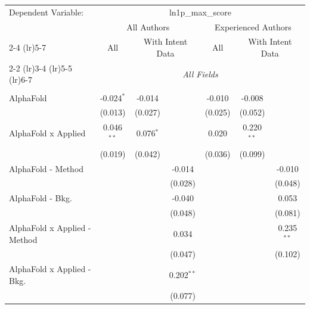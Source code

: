 \begingroup
\centering
\begin{tabular}{lcccccc}
   \tabularnewline \midrule \midrule
   Dependent Variable: & \multicolumn{6}{c}{ln1p\_max\_score}\\
 & \multicolumn{3}{c}{All Authors} & \multicolumn{3}{c}{Experienced Authors} \\
\cmidrule(lr){2-4} \cmidrule(lr){5-7}
 & \multicolumn{1}{c}{All} & \multicolumn{2}{c}{With Intent Data} & \multicolumn{1}{c}{All} & \multicolumn{2}{c}{With Intent Data} \\
\cmidrule(lr){2-2} \cmidrule(lr){3-4} \cmidrule(lr){5-5} \cmidrule(lr){6-7}
 & \multicolumn{6}{c}{\textit{All Fields}} \\ \\
   AlphaFold                      & -0.024$^{*}$   & -0.014       &                & -0.010  & -0.008        &   \\   
                                  & (0.013)        & (0.027)      &                & (0.025) & (0.052)       &   \\   
   AlphaFold x Applied            & 0.046$^{**}$   & 0.076$^{*}$  &                & 0.020   & 0.220$^{**}$  &   \\   
                                  & (0.019)        & (0.042)      &                & (0.036) & (0.099)       &   \\   
   AlphaFold - Method             &                &              & -0.014         &         &               & -0.010\\   
                                  &                &              & (0.028)        &         &               & (0.048)\\   
   AlphaFold - Bkg.               &                &              & -0.040         &         &               & 0.053\\   
                                  &                &              & (0.048)        &         &               & (0.081)\\   
   AlphaFold x Applied - Method   &                &              & 0.034          &         &               & 0.235$^{**}$\\   
                                  &                &              & (0.047)        &         &               & (0.102)\\   
   AlphaFold x Applied - Bkg.     &                &              & 0.202$^{**}$   &         &               &   \\   
                                  &                &              & (0.077)        &         &               &   \\   

\end{tabular}
